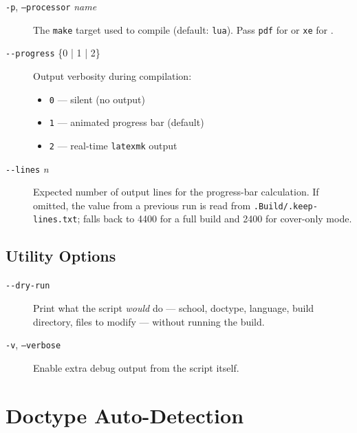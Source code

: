 \begin{description}
  \item[\texttt{-p}, \texttt{--processor} \textit{name}]
        The \texttt{make} target used to compile 
        (default: \texttt{lua}).  Pass \texttt{pdf} for  or
        \texttt{xe} for .

  \item[\texttt{-{}-progress} \{0 | 1 | 2\}]
        Output verbosity during compilation:
        \begin{itemize}
          \item \texttt{0} — silent (no output)
          \item \texttt{1} — animated progress bar (default)
          \item \texttt{2} — real-time \texttt{latexmk} output
        \end{itemize}

  \item[\texttt{-{}-lines} \textit{n}]
        Expected number of output lines for the progress-bar calculation.
        If omitted, the value from a previous run is read from
        \verb!.Build/.keep-lines.txt!; falls back to 4400 for a full build
        and 2400 for cover-only mode.
\end{description}

\subsection{Utility Options}
\label{sec:buildpy_util_opts}

\begin{description}
  \item[\texttt{-{}-dry-run}]
        Print what the script \emph{would} do — school, doctype, language,
        build directory, files to modify — without running the build.

  \item[\texttt{-v}, \texttt{--verbose}]
        Enable extra debug output from the script itself.
\end{description}


\section{Doctype Auto-Detection}
\label{sec:buildpy_autodetect}

